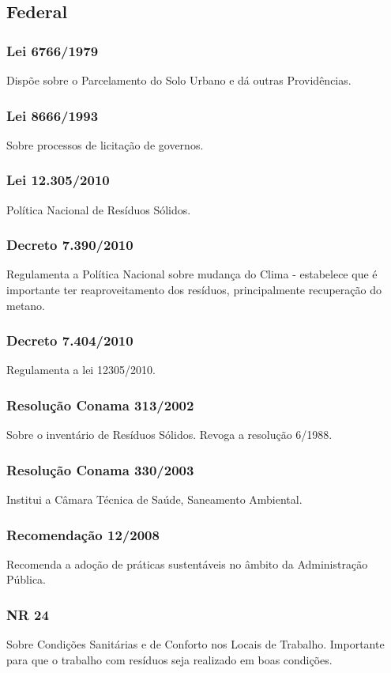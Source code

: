 \begin{subapend}
	\subsection{Federal}
	\begin{subsubapend}
		\subsubsection{Lei 6766/1979}
		Dispõe sobre o Parcelamento do Solo Urbano e dá outras Providências.
		\subsubsection{Lei 8666/1993}
		Sobre processos de licitação de governos.
		\subsubsection{Lei 12.305/2010}
		Política Nacional de Resíduos Sólidos.
		\subsubsection{Decreto 7.390/2010}
		Regulamenta a Política Nacional sobre mudança do Clima - estabelece que é importante ter reaproveitamento dos resíduos, principalmente recuperação do metano.
		\subsubsection{Decreto 7.404/2010}
		Regulamenta a lei 12305/2010.
		\subsubsection{Resolução Conama 313/2002}
		Sobre o inventário de Resíduos Sólidos. Revoga a resolução 6/1988.
		\subsubsection{Resolução Conama 330/2003}
		Institui a Câmara Técnica de Saúde, Saneamento Ambiental.
		\subsubsection{Recomendação 12/2008}
		Recomenda a adoção de práticas sustentáveis no âmbito da Administração Pública.
		\subsubsection{NR 24}
		Sobre Condições Sanitárias e de Conforto nos Locais de Trabalho. Importante para que o trabalho com resíduos seja realizado em boas condições.

\end{subsubapend}
\end{subapend}
